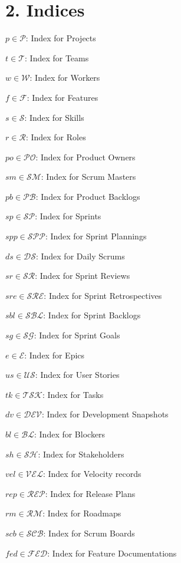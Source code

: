 \documentclass[12pt]{article}
\begin{document}
\section{2. Indices}
\item $ p \in \mathcal{P} $: Index for Projects
    \item $ t \in \mathcal{T} $: Index for Teams
    \item $ w \in \mathcal{W} $: Index for Workers
    \item $ f \in \mathcal{F} $: Index for Features
    \item $ s \in \mathcal{S} $: Index for Skills
    \item $ r \in \mathcal{R} $: Index for Roles
    \item $ po \in \mathcal{PO} $: Index for Product Owners
    \item $ sm \in \mathcal{SM} $: Index for Scrum Masters
    \item $ pb \in \mathcal{PB} $: Index for Product Backlogs
    \item $ sp \in \mathcal{SP} $: Index for Sprints
    \item $ spp \in \mathcal{SPP} $: Index for Sprint Plannings
    \item $ ds \in \mathcal{DS} $: Index for Daily Scrums
    \item $ sr \in \mathcal{SR} $: Index for Sprint Reviews
    \item $ sre \in \mathcal{SRE} $: Index for Sprint Retrospectives
    \item $ sbl \in \mathcal{SBL} $: Index for Sprint Backlogs
    \item $ sg \in \mathcal{SG} $: Index for Sprint Goals
    \item $ e \in \mathcal{E} $: Index for Epics
    \item $ us \in \mathcal{US} $: Index for User Stories
    \item $ tk \in \mathcal{TSK} $: Index for Tasks
    \item $ dv \in \mathcal{DEV} $: Index for Development Snapshots
    \item $ bl \in \mathcal{BL} $: Index for Blockers
    \item $ sh \in \mathcal{SH} $: Index for Stakeholders
    \item $ vel \in \mathcal{VEL} $: Index for Velocity records
    \item $ rep \in \mathcal{REP} $: Index for Release Plans
    \item $ rm \in \mathcal{RM} $: Index for Roadmaps
    \item $ scb \in \mathcal{SCB} $: Index for Scrum Boards
    \item $ fed \in \mathcal{FED} $: Index for Feature Documentations
\end{document}

